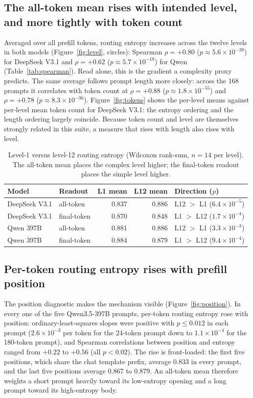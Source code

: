 \documentclass[10pt,twocolumn]{article}
\begin{document}
\subsection{The all-token mean rises with intended level, and more tightly with token count}

Averaged over all prefill tokens, routing entropy increases across the twelve
levels in both models (Figure~\ref{fig:level}, circles): Spearman
$\rho=+0.80$ ($p\approx5.6\times10^{-39}$) for DeepSeek V3.1 and
$\rho=+0.62$ ($p\approx5.7\times10^{-19}$) for Qwen
(Table~\ref{tab:spearman}). Read alone, this is the gradient a complexity
proxy predicts. The same average follows prompt length more closely: across
the 168 prompts it correlates with token count at $\rho=+0.88$
($p\approx1.8\times10^{-55}$) and $\rho=+0.78$ ($p\approx8.3\times10^{-36}$).
Figure~\ref{fig:tokens} shows the per-level means against per-level mean
token count for DeepSeek V3.1: the entropy ordering and the length ordering
largely coincide. Because token count and level are themselves strongly
related in this suite, a measure that rises with length also rises with
level.

\begin{table}[t]
\centering
\caption{Level-1 versus level-12 routing entropy (Wilcoxon rank-sum, $n=14$
per level). The all-token mean places the complex level higher; the
final-token readout places the simple level higher.}
\label{tab:reversal}
\small
\begin{tabular}{llrrl}
\toprule
Model & Readout & L1 mean & L12 mean & Direction ($p$) \\
\midrule
DeepSeek V3.1 & all-token   & 0.837 & 0.886 & L12 $>$ L1 ($6.4\times10^{-5}$) \\
DeepSeek V3.1 & final-token & 0.870 & 0.848 & L1 $>$ L12 ($1.7\times10^{-4}$) \\
Qwen 397B     & all-token   & 0.881 & 0.886 & L12 $>$ L1 ($3.3\times10^{-3}$) \\
Qwen 397B     & final-token & 0.884 & 0.879 & L1 $>$ L12 ($9.4\times10^{-4}$) \\
\bottomrule
\end{tabular}
\end{table}

\subsection{Per-token routing entropy rises with prefill position}

The position diagnostic makes the mechanism visible
(Figure~\ref{fig:position}). In every one of the five Qwen3.5-397B prompts,
per-token routing entropy rose with position: ordinary-least-squares slopes
were positive with $p\le0.012$ in each prompt ($2.6\times10^{-3}$ per token
for the 24-token prompt down to $1.1\times10^{-4}$ for the 180-token prompt),
and Spearman correlations between position and entropy ranged from $+0.22$
to $+0.56$ (all $p<0.02$). The rise is front-loaded: the first five
positions, which share the chat template prefix, average 0.833 in every
prompt, and the last five positions average 0.867 to 0.879. An all-token
mean therefore weights a short prompt heavily toward its low-entropy opening
and a long prompt toward its high-entropy body.
\end{document}
